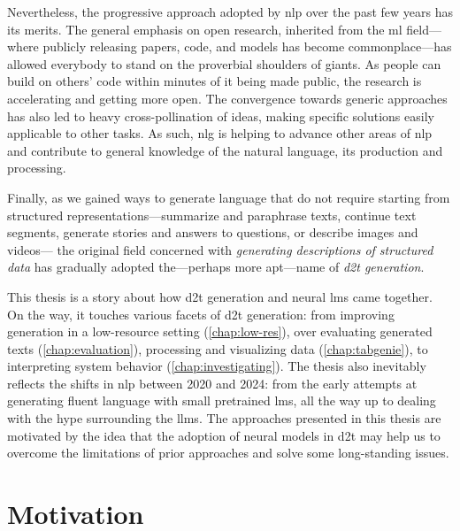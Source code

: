 Nevertheless, the progressive approach adopted by \ac{nlp} over the past few years has its merits. The general emphasis on open research, inherited from the \ac{ml} field---where publicly releasing papers, code, and models has become commonplace---has allowed everybody to stand on the proverbial shoulders of giants. As people can build on others' code within minutes of it being made public, the research is accelerating and getting more open. The convergence towards generic approaches has also led to heavy cross-pollination of ideas, making specific solutions easily applicable to other tasks. As such, \ac{nlg} is helping to advance other areas of \ac{nlp} and contribute to general knowledge of the natural language, its production and processing.

Finally, as we gained ways to generate language that do not require starting from structured representations---summarize and paraphrase texts, continue text segments, generate stories and answers to questions, or describe images and videos---%
the original field concerned with \textit{generating descriptions of structured data} has gradually adopted the---perhaps more apt---name of \emph{\ac{d2t} generation}.

This thesis is a story about how \acl{d2t} generation and neural \aclp{lm} came together. On the way, it touches various facets of \ac{d2t} generation: from improving generation in a low-resource setting (\autoref{chap:low-res}), over evaluating generated texts (\autoref{chap:evaluation}), processing and visualizing data (\autoref{chap:tabgenie}), to interpreting system behavior (\autoref{chap:investigating}). The thesis also inevitably reflects the shifts in \ac{nlp} between 2020 and 2024: from the early attempts at generating fluent language with small pretrained \acp{lm}, all the way up to dealing with the hype surrounding the \acp{llm}.
The approaches presented in this thesis are motivated by the idea that the adoption of neural models in \ac{d2t} may help us to overcome the limitations of prior approaches and solve some long-standing issues.




\section{Motivation}
\label{sec:rq}

